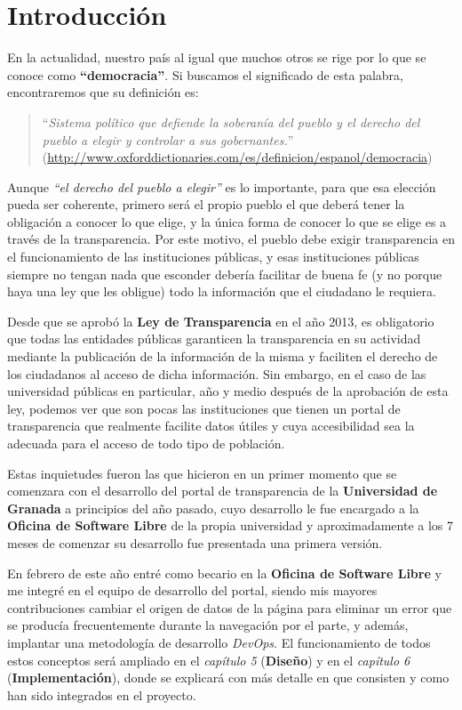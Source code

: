 \chapter{Introducción}

En la actualidad, nuestro país al igual que muchos otros se rige por lo que se conoce como \textbf{``democracia''}. Si buscamos
el significado de esta palabra, encontraremos que su definición es: 

\begin{quote}``\textit{Sistema político que defiende la soberanía del pueblo y el derecho del pueblo a elegir y controlar a sus gobernantes.}''
\newline(\url{http://www.oxforddictionaries.com/es/definicion/espanol/democracia})
\end{quote}

Aunque \textit{``el derecho del pueblo a elegir''} es lo importante, para que esa elección pueda ser coherente, primero será el propio pueblo el que deberá tener la obligación a conocer lo que elige, y la única forma de conocer lo que se elige es a través de la transparencia. Por este motivo, el pueblo debe exigir transparencia en el funcionamiento de las instituciones públicas, y esas instituciones públicas siempre no tengan nada que esconder debería facilitar de buena fe (y no porque haya una ley que les obligue) todo la información que el ciudadano le requiera.

\bigskip
Desde que se aprobó la \textbf{Ley de Transparencia} en el año 2013, es obligatorio que todas las entidades públicas garanticen la transparencia en su actividad mediante la publicación de la información de la misma y faciliten el derecho de los ciudadanos al acceso de dicha información. Sin embargo, en el caso de las universidad públicas en particular, año y medio después de la aprobación de esta ley, podemos ver que son pocas las instituciones que tienen un portal de transparencia que realmente facilite datos útiles y cuya accesibilidad sea la adecuada para el acceso de todo tipo de población.

\bigskip
Estas inquietudes fueron las que hicieron en un primer momento que se comenzara con el desarrollo del portal de transparencia de la \textbf{Universidad de Granada} a principios del año pasado, cuyo desarrollo le fue encargado a la \textbf{Oficina de Software Libre} de la propia universidad y aproximadamente a los 7 meses de comenzar su desarrollo fue presentada una primera versión.

\bigskip
En febrero de este año entré como becario en la \textbf{Oficina de Software Libre} y me integré en el equipo de desarrollo del portal, siendo mis mayores contribuciones cambiar el origen de datos de la página para eliminar un error que se producía frecuentemente durante la navegación por el parte, y además, implantar una metodología de desarrollo \textit{DevOps}. El funcionamiento de todos estos conceptos será ampliado en el \textit{capítulo 5} (\textbf{Diseño}) y en el \textit{capítulo 6} (\textbf{Implementación}), donde se explicará con más detalle en que consisten y como han sido integrados en el proyecto.


